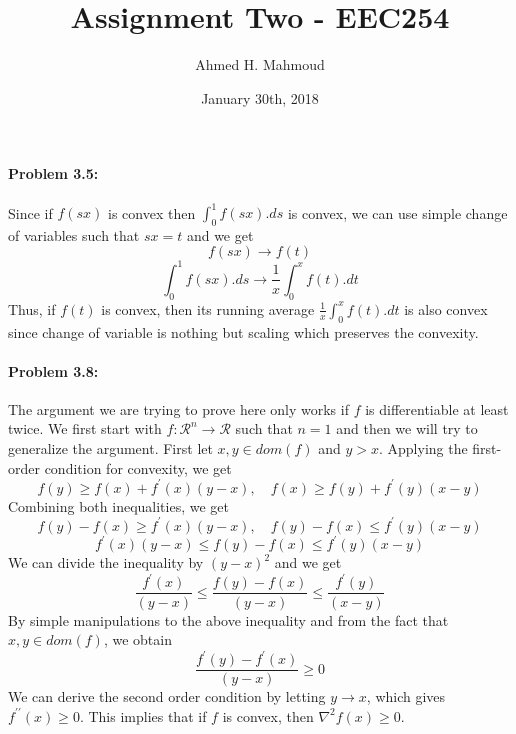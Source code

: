 \documentclass[12pt] {article}
\begin{document}
\title{Assignment Two -  EEC254}
\author{Ahmed H. Mahmoud}
\date{January 30th, 2018}
\maketitle




\paragraph{Problem 3.5:} 
Since if $f(sx)$ is convex then $\int^{1}_{0}f(sx).ds$ is convex, we can use simple change of variables such that $sx=t$ and we get 
$$
f(sx) \rightarrow f(t)
$$
$$ 
\int^{1}_{0} f(sx).ds \rightarrow \frac{1}{x}\int^{x}_{0}f(t).dt
$$
Thus, if $f(t)$ is convex, then its running average $\frac{1}{x}\int^{x}_{0}f(t).dt$ is also convex since change of variable is nothing but scaling which preserves the convexity. 

\paragraph{Problem 3.8:} 
The argument we are trying to prove here only works if $f$ is differentiable at least twice. We first start with $f:\mathcal{R}^{n} \rightarrow \mathcal{R}$ such that $n=1$ and then we will try to generalize the argument. First let $x,y \in dom(f)$ and $y>x$. Applying the first-order condition for convexity, we get 
$$f(y)\geq f(x) + f^{\prime}(x)(y-x), \quad f(x)\geq f(y) + f^{\prime}(y)(x-y)$$
Combining both inequalities, we get
$$f(y) - f(x) \geq f^{\prime}(x)(y-x), \quad f(y) - f(x) \leq f^{\prime}(y)(x-y)$$
$$ f^{\prime}(x)(y-x) \leq f(y) - f(x) \leq f^{\prime}(y)(x-y)$$
We can divide the inequality by $(y-x)^{2}$ and we get 
$$ \frac{f^{\prime}(x)}{(y-x)} \leq \frac{f(y)-f(x)}{(y-x)} \leq \frac{f^{\prime}(y)}{(x-y)}$$
By simple manipulations to the above inequality and from the fact that $x,y \in dom(f)$, we obtain
$$  \frac{f^{\prime}(y) - f^{\prime}(x)}{(y-x)} \geq 0$$
We can derive the second order condition by letting $y\rightarrow x$, which gives $f^{\prime \prime}(x)\geq 0$. This implies that if $f$ is convex, then $\nabla^{2}f(x)\geq 0$. 
\end{document}
